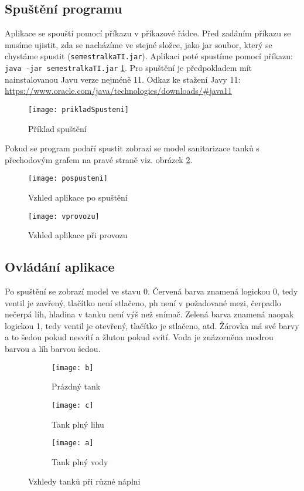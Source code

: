 \documentclass[12pt, a4paper]{article}
\begin{document}
\subsection{Spuštění programu}
Aplikace se spouští pomocí příkazu v příkazové řádce. Před zadáním příkazu se musíme ujistit, zda se nacházíme ve stejné složce, jako jar soubor, který se chystáme spustit (\texttt{semestralkaTI.jar}). Aplikaci poté spustíme pomocí příkazu: \texttt{java -jar semestralkaTI.jar} \ref{spusteni}. Pro spuštění je předpokladem mít nainstalovanou Javu verze nejméně 11. Odkaz ke stažení Javy 11: \url{ https://www.oracle.com/java/technologies/downloads/#java11}

\begin{figure}[h]
\centering 
\texttt{[image: prikladSpusteni]}
\caption{Příklad spuštění}
\label{spusteni}
\end{figure}

Pokud se program podaří spustit zobrazí se model sanitarizace tanků s přechodovým grafem na pravé straně viz. obrázek \ref{vzhled}.

\begin{figure}[h]
\centering 
\texttt{[image: pospusteni]}
\caption{Vzhled aplikace po spuštění}
\label{vzhled}
\end{figure}

\begin{figure}[h]
\centering 
\texttt{[image: vprovozu]}
\caption{Vzhled aplikace při provozu}
\end{figure}

\newpage
\subsection{Ovládání aplikace}
Po spuštění se zobrazí model ve stavu 0. Červená barva znamená logickou 0, tedy ventil je zavřený, tlačítko není stlačeno, ph není v požadované mezi, čerpadlo nečerpá líh, hladina v tanku není výš než snímač. Zelená barva znamená naopak logickou 1, tedy ventil je otevřený, tlačítko je stlačeno, atd. Žárovka má své barvy a to šedou pokud nesvítí a žlutou pokud svítí. Voda je znázorněna modrou barvou a líh barvou šedou.

\begin{figure}[h]
\centering
\begin{subfigure}{0.3\textwidth}
    \texttt{[image: b]}
    \caption{Prázdný tank}
\end{subfigure}
\hfill
\begin{subfigure}{0.3\textwidth}
    \texttt{[image: c]}
    \caption{Tank plný lihu}
\end{subfigure}
\hfill
\begin{subfigure}{0.3\textwidth}
    \texttt{[image: a]}
    \caption{Tank plný vody}
\end{subfigure}
        
\caption{Vzhledy tanků při různé náplni}
\end{figure}
\end{document}
